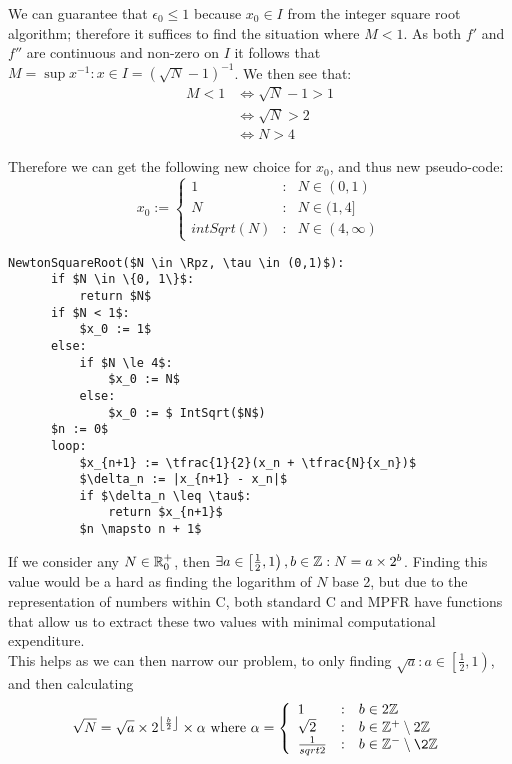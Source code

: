 We can guarantee that \(\epsilon_0 \le 1\) because \(x_0 \in I\) from the integer square root algorithm; therefore it suffices to find the situation where \(M < 1\). As both \(f'\) and \(f''\) are continuous and non-zero on \(I\) it follows that \(M = \sup{x^{-1} : x \in I} = (\sqrt{N} - 1)^{-1}\). We then see that:
\begin{displaymath}
	\begin{align*}
		M < 1 &\iff \sqrt{N} - 1 > 1\\
			  &\iff \sqrt{N} > 2\\
			  &\iff N > 4
	\end{align*}
\end{displaymath}

Therefore we can get the following new choice for \(x_0\), and thus new pseudo-code:
\begin{displaymath}
	x_0 := \left\{\begin{array}{lcl}
		1 &: &N \in (0,1)\\
		N &: &N \in (1,4]\\
		intSqrt(N) &: &N \in (4, \infty)
	\end{array}\right.
\end{displaymath}

\label{PCD_"Newton Square Root v2"}
\begin{lstlisting}[frame=single,mathescape,caption={Basic Newton Method for Square Root}]
  NewtonSquareRoot($N \in \Rpz, \tau \in (0,1)$):
      if $N \in \{0, 1\}$:
          return $N$
      if $N < 1$:
          $x_0 := 1$
      else:
          if $N \le 4$:
              $x_0 := N$
          else:
              $x_0 := $ IntSqrt($N$)
      $n := 0$
      loop:
          $x_{n+1} := \tfrac{1}{2}(x_n + \tfrac{N}{x_n})$
          $\delta_n := |x_{n+1} - x_n|$
          if $\delta_n \leq \tau$:
              return $x_{n+1}$
          $n \mapsto n + 1$
\end{lstlisting}


If we consider any \(N \in \mathbb{R}^+_0\), then \(\exists a \in \left[\frac{1}{2}, 1\right), b \in \mathbb{Z} : N = a \times 2^b\). Finding this value would be a hard as finding the logarithm of \(N\) base 2, but due to the representation of numbers within C, both standard C and MPFR have functions that allow us to extract these two values with minimal computational expenditure.\\

This helps as we can then narrow our problem, to only finding \(\sqrt{a} : a \in \left[\frac{1}{2}, 1\right)\), and then calculating 
\begin{displaymath}
	\sqrt{N} = \sqrt{a} \times 2^{\left\lfloor \frac{b}{2} \right\rfloor} \times \alpha \ \mathrm{where}\  
	\alpha = \left\{
		\begin{array}{lcl}
			1 & : & b \in 2\Z \\
			\sqrt{2} & : & b \in \Zp\setminus2\Z \\
			\frac{1}{sqrt{2}} & : & b \in \Zn\setminus\2\Z
		\end{array}\right.
\end{displaymath}

